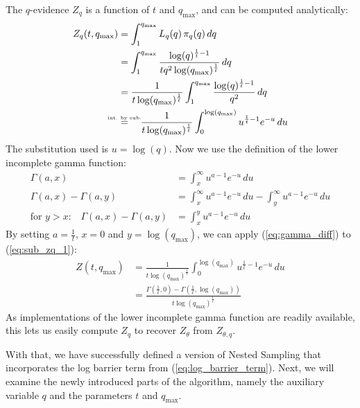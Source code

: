 \documentclass[12pt, a4paper]{report}
\begin{document}
The $q$-evidence $Z_q$ is a function of $t$ and $q_{\textrm{max}}$, and can be computed analytically:
\begin{align}
    Z_q(t, q_{\textrm{max}}) &= \int_1^{q_{\textrm{max}}} L_q(q) \, \pi_q(q) \, dq \nonumber\\
    &= \int_1^{q_{\textrm{max}}} \frac{\log(q)^{\frac{1}{t}-1}}{tq^2\log(q_{\textrm{max}})^\frac{1}{t}} \, dq \nonumber\\
    &= \frac{1}{t \log(q_{\textrm{max}})^{\frac{1}{t}}} \int_1^{q_{\textrm{max}}} \frac{\log(q)^{\frac{1}{t}-1}}{q^2} \, dq \nonumber\\
    &\mathrel{\overset{\makebox[0pt]{\mbox{\normalfont\tiny int. by sub.}}}{=}} \quad \frac{1}{t \log(q_{\textrm{max}})^{\frac{1}{t}}} \int_0^{\log(q_{\textrm{max}})} u^{\frac{1}{t}-1} e^{-u} \, du \label{eq:sub_zq_1}
\end{align}
The substitution used is $u = \log(q)$.
Now we use the definition of the lower incomplete gamma function:
\begin{align}
    \Gamma(a, x) &= \int_x^{\infty} u^{a-1} e^{-u} \, du \nonumber\\
    \Gamma(a, x) - \Gamma(a, y) &= \int_x^{\infty} u^{a-1} e^{-u} \, du - \int_y^{\infty} u^{a-1} e^{-u} \, du \nonumber\\
    \textrm{for } y > x\textrm{:} \quad \Gamma(a, x) - \Gamma(a, y) &= \int_x^y u^{a-1} e^{-u} \, du \label{eq:gamma_diff}
\end{align}
By setting $a = \frac{1}{t}$, $x = 0$ and $y = \log(q_{\textrm{max}})$, we can apply (\ref{eq:gamma_diff}) to (\ref{eq:sub_zq_1}):
\begin{align*}
    Z(t, q_{\textrm{max}}) &= \frac{1}{t \log(q_{\textrm{max}})^{\frac{1}{t}}} \int_0^{\log(q_{\textrm{max}})} u^{\frac{1}{t}-1} e^{-u} \, du \\
    &= \frac{\Gamma(\frac{1}{t}, 0) - \Gamma(\frac{1}{t}, \log(q_{\textrm{max}}))}{t \log(q_{\textrm{max}})^{\frac{1}{t}}}
\end{align*}
As implementations of the lower incomplete gamma function are readily available, this lets us easily compute $Z_q$ to recover $Z_{\theta}$ from $Z_{\theta, q}$.

With that, we have successfully defined a version of Nested Sampling that incorporates the log barrier term from (\ref{eq:log_barrier_term}).
Next, we will examine the newly introduced parts of the algorithm, namely the auxiliary variable $q$ and the parameters $t$ and $q_{\textrm{max}}$.

\FloatBarrier
\end{document}
